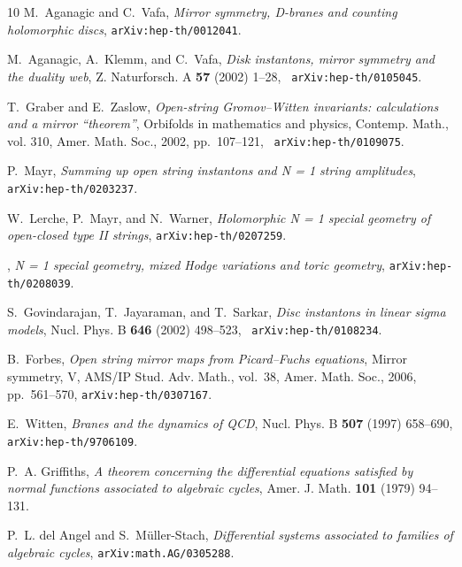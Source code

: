 \begin{thebibliography}{10}
M.~Aganagic and C.~Vafa, {\em Mirror symmetry, {D}-branes and counting
  holomorphic discs}, {\tt arXiv:hep-th/0012041}.

M.~Aganagic, A.~Klemm, and C.~Vafa, {\em Disk instantons, mirror symmetry and
  the duality web}, Z. Naturforsch. A {\bf 57} (2002) 1--28, {\tt
  arXiv:hep-th/0105045}.

T.~Graber and E.~Zaslow, {\em Open-string {G}romov--{W}itten invariants:
  calculations and a mirror ``theorem''}, Orbifolds in mathematics and physics,
  Contemp. Math., vol. 310, Amer. Math. Soc., 2002, pp.~107--121, {\tt
  arXiv:hep-th/0109075}.

P.~Mayr, {\em Summing up open string instantons and {N = 1} string amplitudes},
  {\tt arXiv:hep-th/0203237}.

W.~Lerche, P.~Mayr, and N.~Warner, {\em Holomorphic {N = 1} special geometry of
  open-closed type {II} strings}, {\tt arXiv:hep-th/0207259}.

\bysame, {\em {N = 1} special geometry, mixed {H}odge variations and toric
  geometry}, {\tt arXiv:hep-th/0208039}.

S.~Govindarajan, T.~Jayaraman, and T.~Sarkar, {\em Disc instantons in linear
  sigma models}, Nucl. Phys. B {\bf 646} (2002) 498--523, {\tt
  arXiv:hep-th/0108234}.

B.~Forbes, {\em Open string mirror maps from {P}icard--{F}uchs equations},
  Mirror symmetry, V, AMS/IP Stud. Adv. Math., vol.~38, Amer. Math. Soc., 2006,
  pp.~561--570, {\tt arXiv:hep-th/0307167}.

E.~Witten, {\em Branes and the dynamics of {QCD}}, Nucl. Phys. B {\bf 507}
  (1997) 658--690, {\tt arXiv:hep-th/9706109}.

P.~A. Griffiths, {\em A theorem concerning the differential equations satisfied
  by normal functions associated to algebraic cycles}, Amer. J. Math. {\bf 101}
  (1979) 94--131.

P.~L. del Angel and S.~M{\"u}ller-Stach, {\em Differential systems associated
  to families of algebraic cycles}, {\tt arXiv:math.AG/0305288}.


\end{thebibliography}
